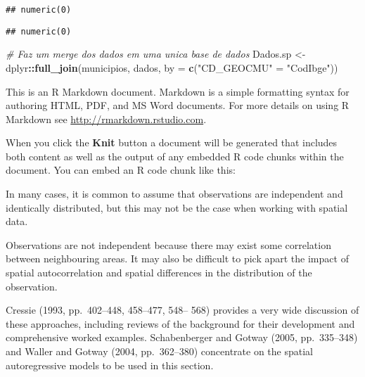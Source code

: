 \documentclass[]{article}
\newenvironment{Shaded}{\begin{snugshade}}{\end{snugshade}}
\newcommand{\KeywordTok}[1]{\textcolor[rgb]{0.13,0.29,0.53}{\textbf{#1}}}
\newcommand{\DataTypeTok}[1]{\textcolor[rgb]{0.13,0.29,0.53}{#1}}
\newcommand{\StringTok}[1]{\textcolor[rgb]{0.31,0.60,0.02}{#1}}
\newcommand{\CommentTok}[1]{\textcolor[rgb]{0.56,0.35,0.01}{\textit{#1}}}
\newcommand{\OperatorTok}[1]{\textcolor[rgb]{0.81,0.36,0.00}{\textbf{#1}}}
\newcommand{\NormalTok}[1]{#1}
\begin{document}
\begin{verbatim}
## numeric(0)
\end{verbatim}

\begin{Shaded}
\end{Shaded}

\begin{verbatim}
## numeric(0)
\end{verbatim}

\begin{Shaded}
\begin{Highlighting}[]
\CommentTok{# Faz um merge dos dados em uma unica base de dados}
\NormalTok{Dados.sp <-}\StringTok{ }\NormalTok{dplyr}\OperatorTok{::}\KeywordTok{full_join}\NormalTok{(municipios, dados,  }\DataTypeTok{by =} \KeywordTok{c}\NormalTok{(}\StringTok{"CD_GEOCMU"}\NormalTok{ =}\StringTok{ "CodIbge"}\NormalTok{))}
\end{Highlighting}
\end{Shaded}

This is an R Markdown document. Markdown is a simple formatting syntax
for authoring HTML, PDF, and MS Word documents. For more details on
using R Markdown see \url{http://rmarkdown.rstudio.com}.

When you click the \textbf{Knit} button a document will be generated
that includes both content as well as the output of any embedded R code
chunks within the document. You can embed an R code chunk like this:

In many cases, it is common to assume that observations are independent
and identically distributed, but this may not be the case when working
with spatial data.

Observations are not independent because there may exist some
correlation between neighbouring areas. It may also be difficult to pick
apart the impact of spatial autocorrelation and spatial differences in
the distribution of the observation.

Cressie (1993, pp.~402--448, 458--477, 548-- 568) provides a very wide
discussion of these approaches, including reviews of the background for
their development and comprehensive worked examples. Schabenberger and
Gotway (2005, pp.~335--348) and Waller and Gotway (2004, pp.~362--380)
concentrate on the spatial autoregressive models to be used in this
section.
\end{document}
